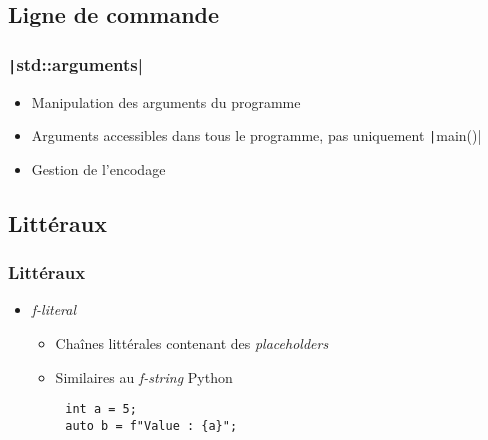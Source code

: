 \documentclass[C++.tex]{subfiles}
\begin{document}
\subsection*{Ligne de commande}
\begin{frame}[fragile]
	\frametitle{\texttt|std::arguments|}
	\begin{itemize}
		\item Manipulation des arguments du programme
		\item Arguments accessibles dans tous le programme, pas uniquement \texttt|main()|
		\item Gestion de l'encodage
	\end{itemize}

\end{frame}

\subsection*{Littéraux}
\begin{frame}[fragile]
	\frametitle{Littéraux}
	\begin{itemize}
		\item \textit{f-literal}
		\begin{itemize}
			\item Chaînes littérales contenant des \textit{placeholders}
			\item Similaires au \textit{f-string} Python
		\end{itemize}
	\end{itemize}

	\begin{verbatim}
		int a = 5;
		auto b = f"Value : {a}";
	\end{verbatim}

\end{frame}
\end{document}
